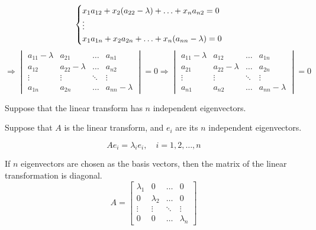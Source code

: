 \begin{enumerate}
\begin{equation*}
\begin{cases}
            x_1a_{12} + x_2(a_{22} - \lambda) + \ldots + x_na_{n2} = 0\\
            \vdots\\
            x_1a_{1n} + x_2a_{2n} + \ldots + x_n(a_{nn} - \lambda) = 0
        \end{cases}\\
    \end{equation*}
    \begin{equation*}
        \Rightarrow \begin{vmatrix}
            a_{11} - \lambda & a_{21} & \ldots & a_{n1}\\
            a_{12} & a_{22} - \lambda & \ldots & a_{n2}\\
            \vdots & \vdots & \ddots & \vdots\\
            a_{1n} & a_{2n} & \ldots & a_{nn} - \lambda
        \end{vmatrix} = 0
        \Rightarrow \begin{vmatrix}
            a_{11} - \lambda & a_{12} & \ldots & a_{1n}\\
            a_{21} & a_{22} - \lambda & \ldots & a_{2n}\\
            \vdots & \vdots & \ddots & \vdots\\
            a_{n1} & a_{n2} & \ldots & a_{nn} - \lambda
        \end{vmatrix} = 0   
    \end{equation*}
\end{enumerate}

















Suppose that the linear transform has $n$ independent eigenvectors.

Suppose that $A$ is the linear transform, and $e_i$ are its $n$ independent eigenvectors.

\[
A e_i = \lambda_i e_i, \quad i = 1, 2, \ldots, n
\]

If $n$ eigenvectors are chosen as the basis vectors, then the matrix of the linear transformation is diagonal.
\begin{equation*}
    A =
    \begin{bmatrix}
        \lambda_1 & 0 & \ldots & 0\\
        0 & \lambda_2 & \ldots & 0\\
        \vdots & \vdots & \ddots & \vdots\\
        0 & 0 & \ldots & \lambda_n
    \end{bmatrix}
\end{equation*}

